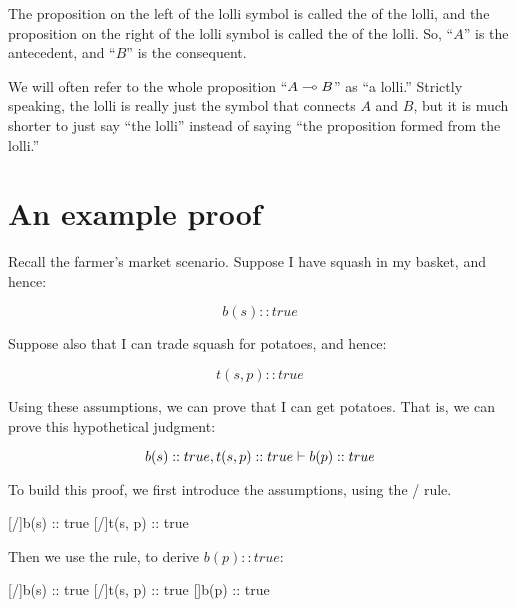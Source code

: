 \documentclass[../../../main.tex]{subfiles}
\begin{document}
The proposition on the left of the lolli symbol is called the  of the lolli, and the proposition on the right of the lolli symbol is called the  of the lolli. So, ``$A$'' is the antecedent, and ``$B$'' is the consequent.

We will often refer to the whole proposition ``$A \lolli/ B$'' as ``a lolli.'' Strictly speaking, the lolli is really just the symbol that connects $A$ and $B$, but it is much shorter to just say ``the lolli'' instead of saying ``the proposition formed from the lolli.''


\section{An example proof}

Recall the farmer's market scenario. Suppose I have squash in my basket, and hence: 

\begin{equation*}
b(s) :: true
\end{equation*}

\noindent
Suppose also that I can trade squash for potatoes, and hence: 

\begin{equation*}
  t(s, p) :: true
\end{equation*}

\noindent  
Using these assumptions, we can prove that I can get potatoes. That is, we can prove this hypothetical judgment:

\begin{equation*}
  b(s) :: true, t(s, p) :: true \ndturnstile/ b(p) :: true
\end{equation*}

\noindent
To build this proof, we first introduce the assumptions, using the \startrule/ rule.

\begin{prooftree*}
  \hypo{}
  [\startrule/]{b(s) :: true}
  \hypo{}
  [\startrule/]{t(s, p) :: true}
\end{prooftree*}

\noindent
Then we use the  rule, to derive $b(p) :: true$:

\begin{prooftree*}
  \hypo{}
  [\startrule/]{b(s) :: true}
  \hypo{}
  [\startrule/]{t(s, p) :: true}
  []{b(p) :: true}
\end{prooftree*}
\end{document}
